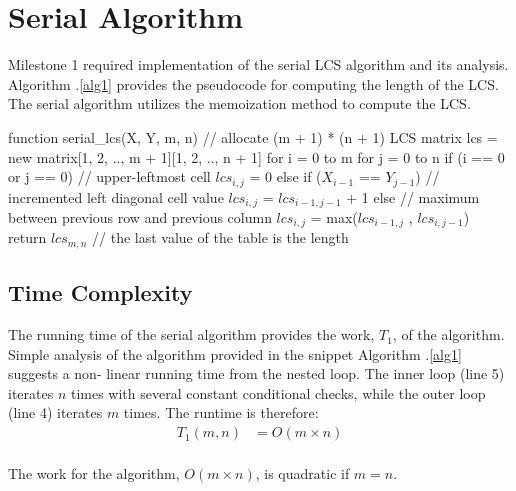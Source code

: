 \documentclass[usletter, 11pt]{extarticle}
\begin{document}
    \section{Serial Algorithm} Milestone 1 required implementation of the
    serial LCS algorithm and its analysis. Algorithm \thesection .\ref{alg1}
    provides the pseudocode for computing the length of the LCS. The serial
    algorithm utilizes the memoization method to compute the LCS.
    \newpage

\begin{pseudocode}[caption={Serial Longest Common Subsequence Length},
label={alg1}]
function serial_lcs(X, Y, m, n)
    // allocate (m + 1) * (n + 1) LCS matrix
    lcs = new matrix[1, 2, .., m + 1][1, 2, .., n + 1]
    for i = 0 to m
        for j = 0 to n
            if (i == 0 or j == 0)  // upper-leftmost cell
                $lcs_{i, j}$ = 0
            else if ($X_{i - 1}$ == $Y_{j - 1}$)
                // incremented left diagonal cell value
                $lcs_{i, j}$ = $lcs_{i-1, j-1}$ + 1  
            else
                // maximum between previous row and previous column
                $lcs_{i, j}$ = max($lcs_{i-1, j}$ , $lcs_{i, j-1}$)
    return $lcs_{m,n}$  // the last value of the table is the length

\end{pseudocode}

        \subsection{Time Complexity} The running time of the serial algorithm
        provides the work, $T_{1}$, of the algorithm. Simple analysis of the
        algorithm provided in the snippet Algorithm \thesection .\ref{alg1}
        suggests a non- linear running time from the nested loop. The inner
        loop (line 5) iterates $n$ times with several constant conditional
        checks, while the outer loop (line 4) iterates $m$ times. The runtime
        is therefore:
        \begin{equation*}
            \begin{split}
                T_1(m, n) & = O(m \times n) \\
            \end{split}
        \end{equation*}

        The work for the algorithm, $O(m \times n)$, is quadratic if $m = n$.
        \newpage
\end{document}
